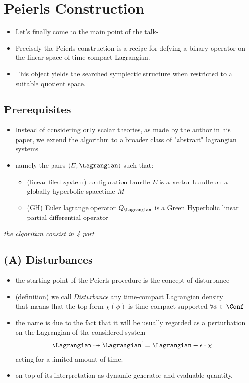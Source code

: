 \documentclass[a4paper,11pt]{scrartcl}
\begin{document}
    \section{Peierls Construction}
    \begin{itemize}
        \item Let's finally come to the main point  of the talk-
        \item Precisely the Peierls construction is a recipe for defying a binary operator on the linear space of time-compact Lagrangian.
        \item This object yields the searched symplectic structure when restricted to a suitable quotient space.
    \end{itemize}
    \subsection{Prerequisites}
    \begin{itemize}
        \item Instead of considering only scalar theories, as made by the author in his paper, we extend the algorithm to a broader class of "abstract" lagrangian systems
        \item namely the pairs $(E,\Lagrangian)$ such that:
        \begin{itemize}
            \item (linear filed system) configuration bundle $E$ is a vector bundle on a globally hyperbolic spacetime $M$
            \item (GH) Euler lagrange operator $Q_\Lagrangian$ is a Green Hyperbolic linear partial differential operator
        \end{itemize}
    \end{itemize}
    \emph{the algorithm consist in 4 part}
    \subsection{(A) Disturbances}
    \begin{itemize}
        \item the starting point of the Peierls procedure is the concept of disturbance
        \item (definition) we call \emph{Disturbance} any time-compact Lagrangian density\\
        that means that the top form $\chi(\phi) $ is time-compact supported  $\forall \phi \in \Conf$
        \item the name is due to the fact that it will be usually regarded as a perturbation on the Lagrangian of the considered system
        $$ \Lagrangian \rightsquigarrow \Lagrangian' = \Lagrangian + \epsilon\cdot \chi$$
        acting for a limited amount of time.
        \item on top of its interpretation as dynamic generator and evaluable quantity.
    \end{itemize}
\end{document}
